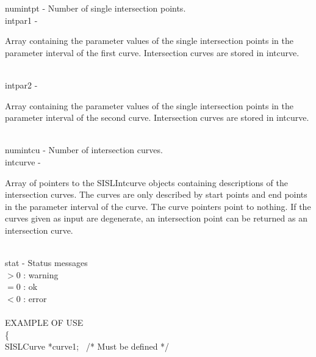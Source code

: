         \>\>    {\fov numintpt}\> - \>  Number of single intersection points.\\
        \>\>    {\fov intpar1}  \> - \> \begin{minipg2}
                        Array containing the parameter values of the
                        single intersection points in the parameter
                        interval of the first curve.
                        Intersection curves are stored in intcurve.
                                \end{minipg2}\\[0.8ex]
        \>\>    {\fov intpar2}  \> - \> \begin{minipg2}
                        Array containing the parameter values of the
                        single intersection points in the parameter
                        interval of the second curve.
                        Intersection curves are stored in intcurve.
                                \end{minipg2}\\[0.8ex]
        \>\>    {\fov numintcu}\> - \>Number of intersection curves.\\
        \>\>    {\fov intcurve}\> - \>  \begin{minipg2}
                        Array of pointers to the SISLIntcurve objects
                        containing descriptions of the intersection
                        curves. The curves are only described by start
                        points and end points in the parameter interval
                        of the curve. The curve pointers point
                        to nothing.
                        If the curves given as input are
                        degenerate, an intersection point can be returned as
                        an intersection curve.
                                \end{minipg2}\\[0.8ex]
        \>\>    {\fov stat}     \> - \> Status messages\\
                \>\>\>\>\>              $> 0$   : warning\\
                \>\>\>\>\>              $= 0$   : ok\\
                \>\>\>\>\>              $< 0$   : error\\
\\ %
EXAMPLE OF USE\\
                \>      \{ \\
                \>\>    SISLCurve       \>      *{\fov curve1}; \, /* Must be defined */\\
